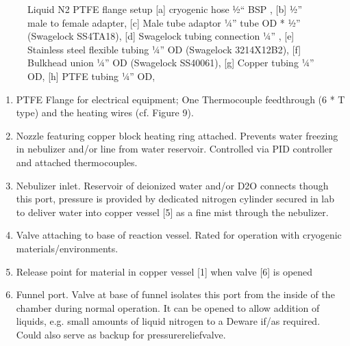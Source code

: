 \documentclass[letterpaper,10pt,english]{jupyterBook}
\begin{document}
\begin{figure}[htbp]
\centering
\capstart

\noindent{}
\caption{Liquid N2 PTFE flange setup {[}a{]} cryogenic hose ½“ BSP , {[}b{]} ½” male to female adapter, {[}c{]} Male tube adaptor ¼” tube OD * ½” (Swagelock SS\sphinxhyphen{}4\sphinxhyphen{}TA\sphinxhyphen{}1\sphinxhyphen{}8), {[}d{]} Swagelock tubing connection ¼” , {[}e{]} Stainless steel flexible tubing ¼” OD (Swagelock 321\sphinxhyphen{}4\sphinxhyphen{}X\sphinxhyphen{}12\sphinxhyphen{}B2), {[}f{]} Bulkhead union ¼” OD (Swagelock SS400\sphinxhyphen{}61), {[}g{]} Copper tubing ¼” OD, {[}h{]} PTFE tubing ¼” OD,}\label{\detokenize{Chapter7/Chapter7:directive-fig3}}\end{figure}
\begin{enumerate}
%
\setcounter{enumi}{2}
\item {} 
\sphinxAtStartPar
PTFE Flange for electrical equipment; One Thermocouple feedthrough (6 * T type) and the heating wires (cf. Figure 9).

\item {} 
\sphinxAtStartPar
Nozzle featuring copper block heating ring attached. Prevents water freezing in nebulizer and/or line from water reservoir. Controlled via PID controller and attached thermocouples.

\item {} 
\sphinxAtStartPar
Nebulizer inlet. Reservoir of deionized water and/or D2O connects though this port, pressure is provided by dedicated nitrogen cylinder secured in lab to deliver water into copper vessel {[}5{]} as a fine mist through the nebulizer.

\item {} 
\sphinxAtStartPar
Valve attaching to base of reaction vessel. Rated for operation with cryogenic materials/environments.

\item {} 
\sphinxAtStartPar
Release point for material in copper vessel {[}1{]} when valve {[}6{]} is opened

\item {} 
\sphinxAtStartPar
Funnel port. Valve at base of funnel isolates this port from the inside of the chamber during normal operation. It can be opened to allow addition of liquids, e.g. small amounts of liquid nitrogen to a Deware if/as required. Could also serve as back\sphinxhyphen{}up for pressure\sphinxhyphen{}relief\sphinxhyphen{}valve.

\end{enumerate}
\end{document}
